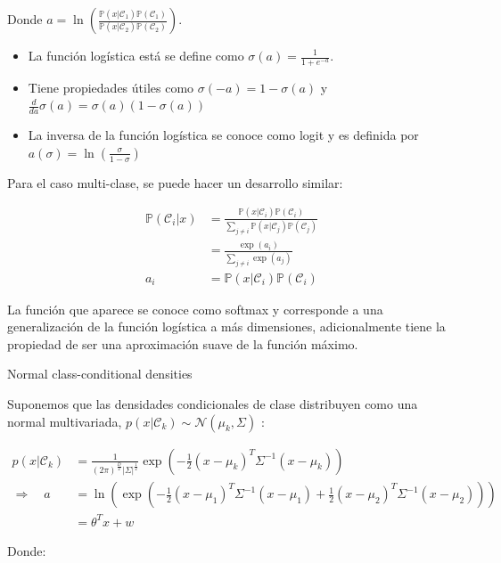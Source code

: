 Donde $a = \ln(\frac{\mathbb{P}(x|\mathcal{C}_1)\mathbb{P}(\mathcal{C}_1)}{\mathbb{P}(x|\mathcal{C}_2)\mathbb{P}(\mathcal{C}_2)})$.

\begin{itemize}
    \item La función logística está se define como $\sigma(a) = \frac{1}{1+e^{-a}}$.
    
    \item Tiene propiedades útiles como $\sigma(-a)=1-\sigma(a)$ y $\frac{d}{da}\sigma(a)=\sigma(a)(1-\sigma(a))$
    
    \item La inversa de la función logística se conoce como logit y es definida por $a(\sigma)=\ln(\frac{\sigma}{1-\sigma})$
\end{itemize}

Para el caso multi-clase, se puede hacer un desarrollo similar:

\begin{align}
    \mathbb{P}(\mathcal{C}_i | x) &= \frac{\mathbb{P}(x | \mathcal{C}_i)\mathbb{P}(\mathcal{C}_i)}{\sum_{j\neq i}\mathbb{P}(x | \mathcal{C}_j)\mathbb{P}(\mathcal{C}_j)}\\
    &= \frac{\exp(a_i)}{\sum_{j\neq i}\exp(a_j)}\\
    a_i &= \mathbb{P}(x | \mathcal{C}_i)\mathbb{P}(\mathcal{C}_i)
\end{align}

La función que aparece se conoce como softmax y corresponde a una generalización de la función logística a más dimensiones, adicionalmente tiene la propiedad de ser una aproximación suave de la función máximo.

\newpage

 Normal class-conditional densities

Suponemos que las densidades condicionales de clase distribuyen como una normal multivariada, $p(x|\mathcal{C}_k) \sim \mathcal{N} (\mu_k,\Sigma)$ :

\begin{align}
p(x|\mathcal{C}_k)&=\frac{1}{(2\pi)^\frac{D}{2}|\Sigma|^\frac{1}{2}}\exp(-\frac{1}{2}(x-\mu_k)^T\Sigma^{-1}(x-\mu_k))\\
\Rightarrow \quad a &= \ln(\exp(-\frac{1}{2}(x-\mu_1)^T\Sigma^{-1}(x-\mu_1) +\frac{1}{2}(x-\mu_2)^T\Sigma^{-1}(x-\mu_2)))\\
&= \theta^Tx+w
\end{align}

Donde:

